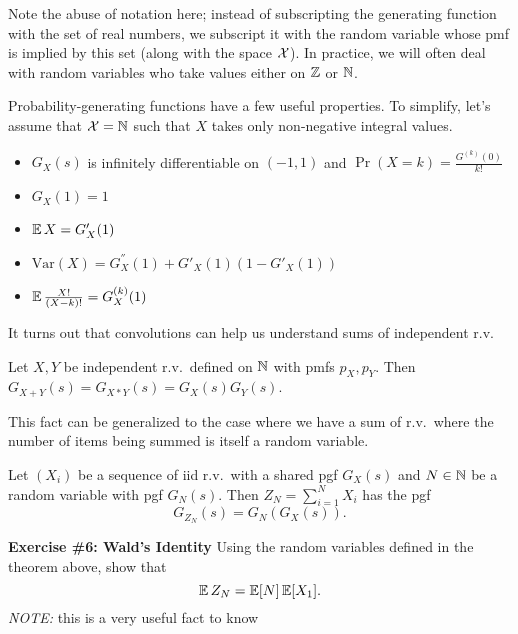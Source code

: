 Note the abuse of notation here;
instead of subscripting the generating function with the set of real numbers,
we subscript it with the random variable whose pmf is implied by this set (along 
with the space $\mathcal X$). In practice, we will often deal with random variables who take 
values either on $\mathbb Z$ or $\mathbb N$.

Probability-generating functions have a few useful properties. To simplify, let's 
assume that $\mathcal X = \mathbb N$ such that $X$ takes only non-negative integral values.

\begin{itemize}
    \item $G_X(s)$ is infinitely differentiable on $(-1,1)$ and $\Pr(X = k) = \frac{G^{(k)}(0)}{k!}$
    \item $G_X(1) = 1$
    \item $\operatorname*{\mathbb{E}} X = G'_X(1)$
    \item $\text{Var}(X) = G_X^{''}(1) + G'_X(1)(1 - G'_X(1))$
    \item $\operatorname*{\mathbb{E}} \frac{X!}{(X-k)!} = G_X^{(k)}(1)$
\end{itemize}

It turns out that convolutions can help us understand sums of independent 
r.v.\

\begin{theorem}
    Let $X,Y$ be independent r.v.\ defined on $\mathbb N$ with pmfs $p_X, p_Y$.
    Then $G_{X+Y}(s) = G_{X*Y}(s) = G_X(s) G_Y(s)$.
\end{theorem}

This fact can be generalized to the case where we have a sum of r.v.\ where the 
number of items being summed is itself a random variable.

\begin{theorem}
    Let $(X_i)$ be a sequence of iid r.v.\ with a shared 
    pgf $G_X(s)$ and 
    $N \in \mathbb N$ be a random variable with pgf $G_N(s)$.
    Then $Z_N = \sum_{i=1}^{N} X_i$ has the pgf
    \[
        G_{Z_N}(s)
        =
        G_N \left( G_X(s) \right).
    \]
\end{theorem}

\begin{tcolorbox}
    \textbf{Exercise \#6: Wald's Identity}
    Using the random variables defined in the theorem above,
    show that 
    \[
        \operatorname*{\mathbb{E}} Z_N
        =
        \operatorname*{\mathbb{E}} [N] \operatorname*{\mathbb{E}}[X_1].
    \]
    \textit{NOTE:} this is a very useful fact to know
\end{tcolorbox}

